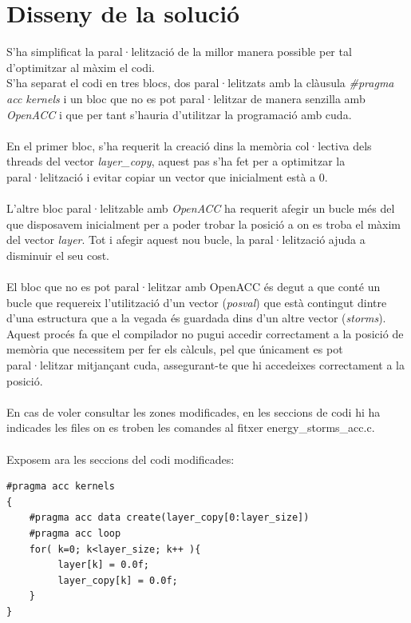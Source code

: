 \documentclass[a4paper, 11pt]{article}
\begin{document}
\section{Disseny de la solució}
S'ha simplificat la paral·lelització de la millor manera possible per tal d'optimitzar al màxim el codi.\\
S'ha separat el codi en tres blocs, dos paral·lelitzats amb la clàusula \textit{\#pragma acc kernels} i un bloc que no es pot paral·lelitzar de manera senzilla amb \textit{OpenACC} i que per tant s'hauria d'utilitzar la programació amb cuda.\\\\ 
En el primer bloc, s'ha requerit la creació dins la memòria col·lectiva dels threads del vector \textit{layer\_copy}, aquest pas s'ha fet per a optimitzar la paral·lelització i evitar copiar un vector que inicialment està a 0. \\\\
L'altre bloc paral·lelitzable amb \textit{OpenACC} ha requerit afegir un bucle més del que disposavem inicialment per a poder trobar la posició a on es troba el màxim del vector \textit{layer}. Tot i afegir aquest nou bucle, la paral·lelització ajuda a disminuir el seu cost. \\\\
El bloc que no es pot paral·lelitzar amb OpenACC és degut a que conté un bucle que requereix l'utilització d'un vector (\textit{posval}) que està contingut dintre d'una estructura que a la vegada és guardada dins d'un altre vector (\textit{storms}). Aquest procés fa que el compilador no pugui accedir correctament a la posició de memòria que necessitem per fer els càlculs, pel que únicament es pot paral·lelitzar mitjançant cuda, assegurant-te que hi accedeixes correctament a la posició.\\\\
En cas de voler consultar les zones modificades, en les seccions de codi hi ha indicades les files on es troben les comandes al fitxer \textcolor{darkpastelgreen}{energy\_storms\_acc.c}.\\\\
Exposem ara les seccions del codi modificades:
\begin{lstlisting}[language = GERONA, firstnumber = 180]
#pragma acc kernels
{
    #pragma acc data create(layer_copy[0:layer_size]) 
    #pragma acc loop
    for( k=0; k<layer_size; k++ ){
         layer[k] = 0.0f;
         layer_copy[k] = 0.0f;
    }
}
\end{lstlisting}
\newpage
\end{document}
